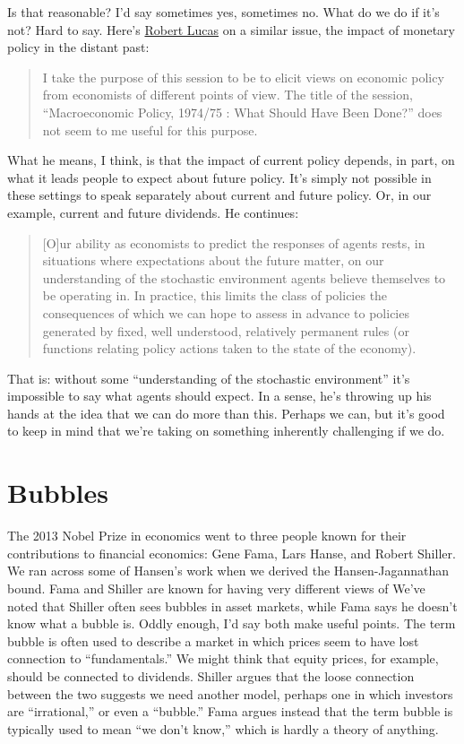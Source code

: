 \documentclass[11pt]{article}
\begin{document}
Is that reasonable?  I'd say sometimes yes, sometimes no.  What do we do if it's not?  Hard to say.  
Here's \href{http://www.nber.org/chapters/c6264.pdf}{Robert Lucas} 
on a similar issue, the impact of monetary policy in the distant past:
\begin{quote}
I take the purpose of this session to be to elicit views on economic
policy from economists of different points of view. The title
of the session, ``Macroeconomic Policy, 1974/75 : What Should Have
Been Done?'' does not seem to me useful for this purpose. 
\end{quote} 
What he means, I think, is that the impact of current policy depends, in part, 
on what it leads people to expect about future policy.
It's simply not possible in these settings to speak separately
about current and future policy.  
Or, in our example, current and future dividends.  
He continues:
\begin{quote} 
[O]ur ability as economists to predict the responses of
agents rests, in situations where expectations about the future matter,
on our understanding of the stochastic environment agents believe themselves
to be operating in. In practice, this limits the class of policies the
consequences of which we can hope to assess in advance to policies
generated by fixed, well understood, relatively permanent rules (or functions
relating policy actions taken to the state of the economy).
\end{quote} 
%
That is:  without some ``understanding of the stochastic environment'' 
it's impossible to say what agents should expect.
In a sense, he's throwing up his hands at the idea that we can do more than this.  
Perhaps we can, but it's good to keep in mind that we're taking 
on something inherently challenging if we do.  


\section{Bubbles}

The 2013 Nobel Prize in economics went to three people known for their
contributions to financial economics:  Gene Fama, Lars Hanse, and Robert Shiller.
We ran across some of Hansen's work when we derived the Hansen-Jagannathan bound.
Fama and Shiller are known for having very different views of
We've noted that Shiller often sees bubbles in asset markets,
while Fama says he doesn't know what a bubble is.
Oddly enough, I'd say both make useful points.
The term bubble is often used to describe a market in which prices
seem to have lost connection to ``fundamentals.''
We might think that equity prices, for example, should be connected to dividends.
Shiller argues that the loose connection between the two suggests we need another model,
perhaps one in which investors are ``irrational,''
or even a ``bubble.''
Fama argues instead that the term bubble is typically used to mean ``we don't know,''
which is hardly a theory of anything.
\end{document}
